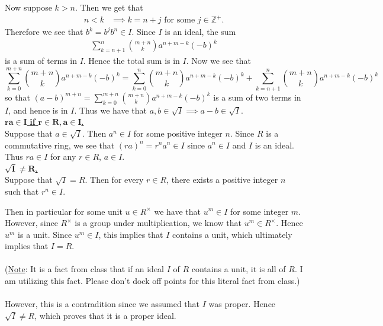 \documentclass[12pt,letterpaper]{algebra_book}
\theoremstyle{definition}
\begin{document}
\begin{prf}
\begin{enumerate}
            Now suppose $k > n$. Then we get that 
            \begin{align*}
                n < k &\implies k =  n + j \text{ for some } j \in \mathbb{Z}^{+}.
            \end{align*}
            Therefore we see that $b^{k} = b^{j}b^{n} \in I$. Since $I$ is an
            ideal, the sum
            \begin{align*}
                \sum_{k = n+1}^{n}\binom{m+n}{k}a^{n + m - k}(-b)^{k}  
            \end{align*}
            is a sum of terms in $I$. Hence the total sum is in $I$. Now we
            see that 
            \[
                \sum_{k = 0}^{m + n}\binom{m+n}{k}a^{n + m - k}(-b)^{k}
                =
                \sum_{k = 0}^{n}\binom{m+n}{k}a^{n + m - k}(-b)^{k}  
                + 
                \sum_{k = n+1}^{n}\binom{m+n}{k}a^{n + m - k}(-b)^{k}
            \]
            so that $\displaystyle (a - b)^{m+n} = \sum_{k = 0}^{m + n}\binom{m+n}{k}a^{n +
            m - k}(-b)^{k}$ is a sum of two terms in $I$, and hence is in $I$.
            Thus we have that $a, b \in \sqrt{I} \implies a - b \in \sqrt{I}$.
            \\[1.2ex]
            \noindent\underline{$\bm{ra \in I}$ \textbf{if} $\bm{r \in R, a
            \in I}$.}\\[1.2ex]
            Suppose that $a \in \sqrt{I}$. Then $a^n \in I$ for some positive integer
            $n$. Since $R$ is a commutative ring, we see that $(ra)^n = r^na^n
            \in I$ since $a^n \in I$ and $I$ is an ideal. Thus $ra \in I$ for
            any $r \in R$, $a \in I$. 
            \\[1.2ex]
            \noindent\underline{$\bm{\sqrt{I} \ne R}$.}\\[1.2ex]
            Suppose that $\sqrt{I} = R$. Then for every $r \in R$, there
            exists a positive integer $n$ such that $r^n  \in I$. 
    
            Then in particular for some unit $u \in R^{\times}$ we have that $u^m
            \in I$ for some integer $m$. However, since $R^\times$ is a
            group under multiplication, we know that $u^m \in R^{\times}$.
            Hence $u^m$ is a unit. Since $u^m \in I$, this implies that
            $I$ contains a unit, which ultimately implies that $I = R$. 
            \\
            \\
            (\underline{Note}: It is a fact from class that if an ideal
            $I$ of $R$ contains a unit, it is all of $R$. I am utilizing
            this fact. Please don't dock off points for this literal fact
            from class.)
            \\
            \\
            However, this is a contradition since we assumed that $I$ was
            proper. Hence $\sqrt{I} \ne R$, which proves that it is a
            proper ideal.
    

\end{enumerate}
\end{prf}
\end{document}
